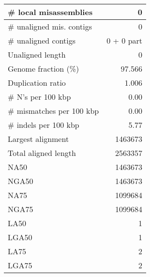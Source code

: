 \documentclass[12pt,a4paper]{article}
\begin{document}
\begin{table}[ht]
\begin{center}
\begin{tabular}{|l*{1}{|r}|}
\# local misassemblies & 0 \\ \hline
\# unaligned mis. contigs & 0 \\ \hline
\# unaligned contigs & 0 + 0 part \\ \hline
Unaligned length & 0 \\ \hline
Genome fraction (\%) & 97.566 \\ \hline
Duplication ratio & 1.006 \\ \hline
\# N's per 100 kbp & 0.00 \\ \hline
\# mismatches per 100 kbp & 0.00 \\ \hline
\# indels per 100 kbp & 5.77 \\ \hline
Largest alignment & 1463673 \\ \hline
Total aligned length & 2563357 \\ \hline
NA50 & 1463673 \\ \hline
NGA50 & 1463673 \\ \hline
NA75 & 1099684 \\ \hline
NGA75 & 1099684 \\ \hline
LA50 & 1 \\ \hline
LGA50 & 1 \\ \hline
LA75 & 2 \\ \hline
LGA75 & 2 \\ \hline
\end{tabular}
\end{center}
\end{table}
\end{document}
